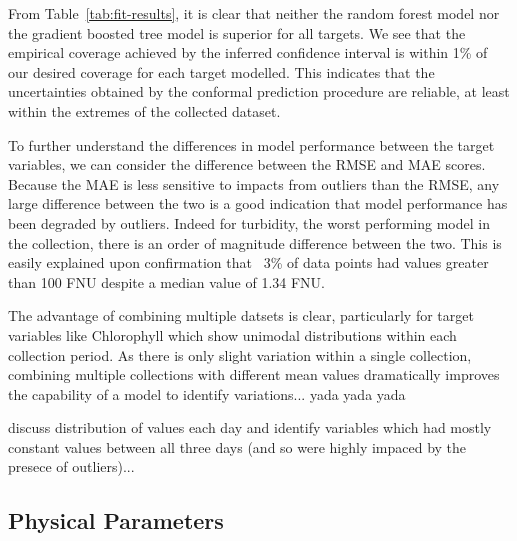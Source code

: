 \documentclass[journal,article,submit,pdftex,moreauthors]{Definitions/mdpi}
\begin{document}
From Table~\ref{tab:fit-results}, it is clear that neither the random forest model nor the gradient boosted tree model is superior for all targets. We see that the empirical coverage achieved by the inferred confidence interval is within 1\% of our desired coverage for each target modelled. This indicates that the uncertainties obtained by the conformal prediction procedure are reliable, at least within the extremes of the collected dataset. 

To further understand the differences in model performance between the target variables, we can consider the difference between the RMSE and MAE scores. Because the MAE is less sensitive to impacts from outliers than the RMSE, any large difference between the two is a good indication that model performance has been degraded by outliers. Indeed for turbidity, the worst performing model in the collection, there is an order of magnitude difference between the two. This is easily explained upon confirmation that ~3\% of data points had values greater than 100 FNU despite a median value of 1.34 FNU.

The advantage of combining multiple datsets is clear, particularly for target variables like Chlorophyll which show unimodal distributions within each collection period. As there is only slight variation within a single collection, combining multiple collections with different mean values dramatically improves the capability of a model to identify variations... yada yada yada




discuss distribution of values each day and identify variables which had mostly constant values between all three days (and so were highly impaced by the presece of outliers)...


\subsection{Physical Parameters}
\end{document}
